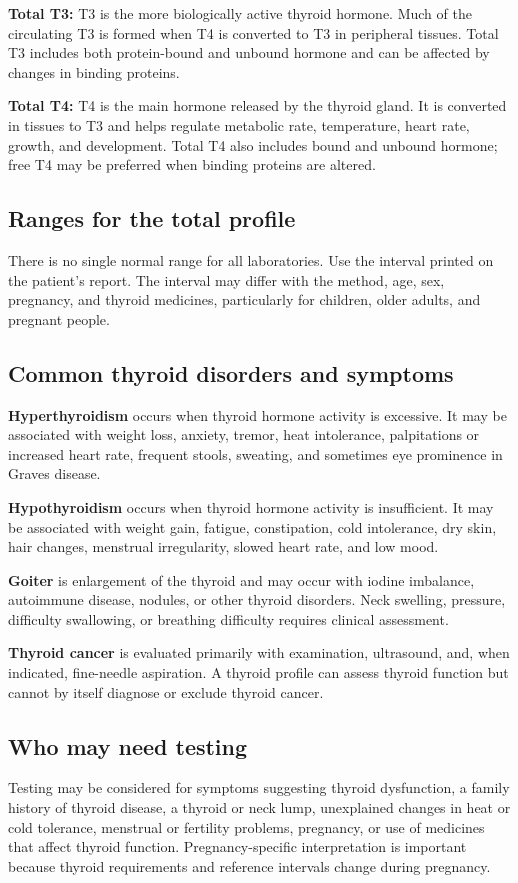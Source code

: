 \documentclass[11pt,openany]{book}
\begin{document}
\textbf{Total T3:} T3 is the more biologically active thyroid hormone. Much of
the circulating T3 is formed when T4 is converted to T3 in peripheral tissues.
Total T3 includes both protein-bound and unbound hormone and can be affected by
changes in binding proteins.

\textbf{Total T4:} T4 is the main hormone released by the thyroid gland. It is
converted in tissues to T3 and helps regulate metabolic rate, temperature,
heart rate, growth, and development. Total T4 also includes bound and unbound
hormone; free T4 may be preferred when binding proteins are altered.

\subsection*{Ranges for the total profile}
There is no single normal range for all laboratories. Use the interval printed
on the patient's report. The interval may differ with the method, age, sex,
pregnancy, and thyroid medicines, particularly for children, older adults, and
pregnant people.

\subsection*{Common thyroid disorders and symptoms}
\textbf{Hyperthyroidism} occurs when thyroid hormone activity is excessive. It
may be associated with weight loss, anxiety, tremor, heat intolerance,
palpitations or increased heart rate, frequent stools, sweating, and sometimes
eye prominence in Graves disease.

\textbf{Hypothyroidism} occurs when thyroid hormone activity is insufficient. It
may be associated with weight gain, fatigue, constipation, cold intolerance,
dry skin, hair changes, menstrual irregularity, slowed heart rate, and low
mood.

\textbf{Goiter} is enlargement of the thyroid and may occur with iodine
imbalance, autoimmune disease, nodules, or other thyroid disorders. Neck
swelling, pressure, difficulty swallowing, or breathing difficulty requires
clinical assessment.

\textbf{Thyroid cancer} is evaluated primarily with examination, ultrasound,
and, when indicated, fine-needle aspiration. A thyroid profile can assess
thyroid function but cannot by itself diagnose or exclude thyroid cancer.

\subsection*{Who may need testing}
Testing may be considered for symptoms suggesting thyroid dysfunction, a family
history of thyroid disease, a thyroid or neck lump, unexplained changes in heat
or cold tolerance, menstrual or fertility problems, pregnancy, or use of
medicines that affect thyroid function. Pregnancy-specific interpretation is
important because thyroid requirements and reference intervals change during
pregnancy.
\end{document}
